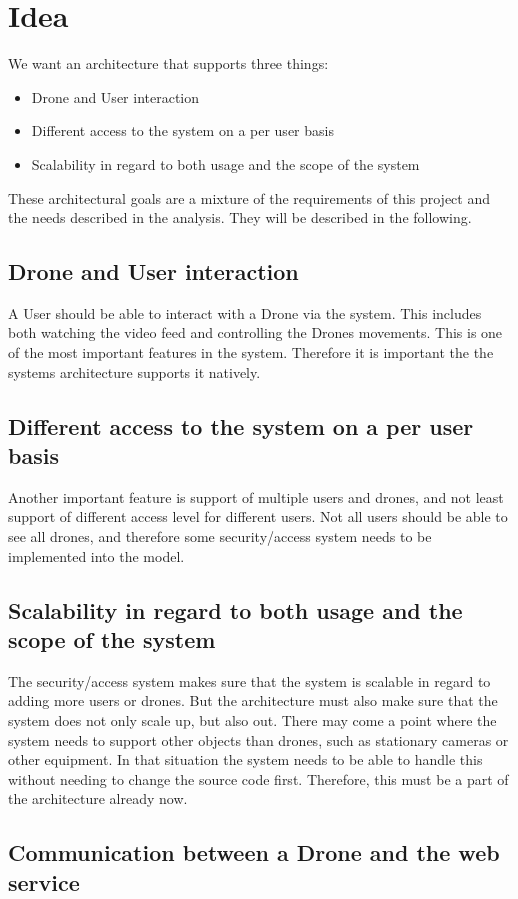 

\section{Idea}
We want an architecture that supports three things:

\begin{itemize}
	\item Drone and User interaction
	\item Different access to the system on a per user basis 
	\item Scalability in regard to both usage and the scope of the system
\end{itemize}

These architectural goals are a mixture of the requirements of this project and the needs described in the analysis. 
They will be described in the following. 


\subsection{Drone and User interaction}
A User should be able to interact with a Drone via the system.
This includes both watching the video feed and controlling the Drones movements.
This is one of the most important features in the system.
Therefore it is important the the systems architecture supports it natively. 


\subsection{Different access to the system on a per user basis}
Another important feature is support of multiple users and drones, and not least support of different access level for different users.
Not all users should be able to see all drones, and therefore some security/access system needs to be implemented into the model. 


\subsection{Scalability in regard to both usage and the scope of the system}
The security/access system makes sure that the system is scalable in regard to adding more users or drones. 
But the architecture must also make sure that the system does not only scale up, but also out. 
There may come a point where the system needs to support other objects than drones, such as stationary cameras or other equipment. 
In that situation the system needs to be able to handle this without needing to change the source code first.
Therefore, this must be a part of the architecture already now. 


\subsection{Communication between a Drone and the web service}


